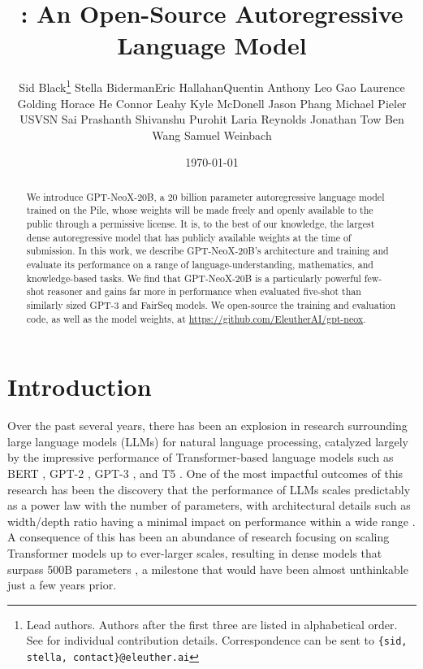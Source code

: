 \documentclass[11pt]{article}
\title{\model: An Open-Source Autoregressive Language Model}
\author{Sid Black\thanks{Lead authors. Authors after the first three are listed in alphabetical order. See \Cref{app:contrib} for individual contribution details. Correspondence can be sent to \texttt{\{sid, stella, contact\}@eleuther.ai}} \And Stella Biderman\protect\footnotemark[1] \And Eric Hallahan\protect\footnotemark[1] \AND Quentin Anthony \And Leo Gao \And Laurence Golding \And Horace He \AND Connor Leahy \And Kyle McDonell \And Jason Phang \And Michael Pieler \AND USVSN Sai Prashanth \And Shivanshu Purohit \And Laria Reynolds \AND Jonathan Tow \And Ben Wang \And Samuel Weinbach}
\date{\today}
\newcommand{\model}{GPT-NeoX-20B}
\begin{document}
\maketitle

\begin{abstract}

    We introduce \model{}, a 20 billion parameter autoregressive language model trained on the Pile, whose weights will be made freely and openly available to the public through a permissive license. It is, to the best of our knowledge, the largest dense autoregressive model that has publicly available weights at the time of submission. In this work, we describe \model{}'s architecture and training and evaluate its performance on a range of language-understanding, mathematics, and knowledge-based tasks. We find that GPT-NeoX-20B is a particularly powerful few-shot reasoner and gains far more in performance when evaluated five-shot than similarly sized GPT-3 and FairSeq models. We open-source the training and evaluation code, as well as the model weights, at \url{https://github.com/EleutherAI/gpt-neox}.
  
\end{abstract}

\section{Introduction}
\label{sec:intro}

Over the past several years, there has been an explosion in research surrounding large language models (LLMs) for natural language processing, catalyzed largely by the impressive performance of Transformer-based language models such as BERT \citep{devlin2019bert}, GPT-2 \citep{radford2019language}, GPT-3 \citep{brown2020language}, and T5 \citep{raffel2020exploring}. One of the most impactful outcomes of this research has been the discovery that the performance of LLMs scales predictably as a power law with the number of parameters, with architectural details such as width/depth ratio having a minimal impact on performance within a wide range \citep{kaplan2020scaling}. A consequence of this has been an abundance of research focusing on scaling Transformer models up to ever-larger scales, resulting in dense models that surpass 500B parameters \citep{megatron-530b,chowdhery2022palm}, a milestone that would have been almost unthinkable just a few years prior.
\end{document}
